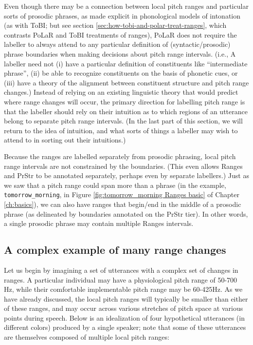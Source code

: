 \documentclass[11pt, twoside]{memoir}
\begin{document}
Even though there may be a connection between local pitch ranges and particular sorts of prosodic phrases, as made explicit in phonological models of intonation (as with ToBI; but see section \ref{sec:how-tobi-and-polar-treat-ranges}, which contrasts PoLaR and ToBI treatments of ranges), PoLaR does not require the labeller to always attend to any particular definition of (syntactic\slash prosodic) phrase boundaries when making decisions about pitch range intervals. (i.e., A labeller need not (i) have a particular definition of constituents like “intermediate phrase”, (ii) be able to recognize constituents on the basis of phonetic cues, or (iii) have a theory of the alignment between constituent structure and pitch range changes.) Instead of relying on an existing linguistic theory that would predict where range changes will occur, the primary direction for labelling pitch range is that the labeller should rely on their intuition as to which regions of an utterance belong to separate pitch range intervals. (In the last part of this section, we will return to the idea of intuition, and what sorts of things a labeller may wish to attend to in sorting out their intuitions.)

Because the ranges are labelled separately from prosodic phrasing, local pitch range intervals are not constrained by the boundaries. (This even allows Ranges and PrStr to be annotated separately, perhaps even by separate labellers.) Just as we saw that a pitch range could span more than a phrase (in the example, \texttt{tomorrow\_morning}, in Figure \ref{fig:tomorrow_morning Ranges basic} of Chapter \ref{ch:basics}), we can also have ranges that begin\slash end in the middle of a prosodic phrase (as delineated by boundaries annotated on the PrStr tier). In other words, a single prosodic phrase may contain multiple Ranges intervals.

\subsection{A complex example of many range changes}\label{sec:a-complex-example-of-many-range-changes}

Let us begin by imagining a set of utterances with a complex set of changes in ranges. A particular individual may have a physiological pitch range of 50-700 Hz, while their comfortable implementable pitch range may be 60-425Hz. As we have already discussed, the local pitch ranges will typically be smaller than either of these ranges, and may occur across various stretches of pitch space at various points during speech. Below is an idealization of four hypothetical utterances (in different colors) produced by a single speaker; note that some of these utterances are themselves composed of multiple local pitch ranges:
\end{document}
